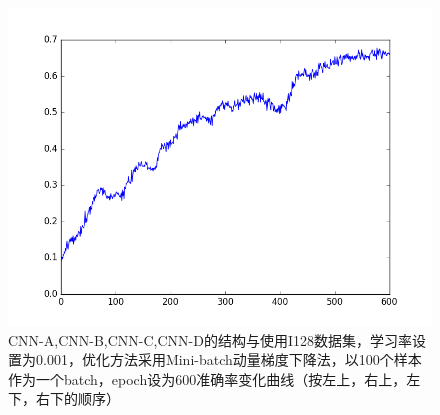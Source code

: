 \begin{figure}[htb]
\includegraphics[scale=0.35]{../figures/Log/VGGNet_new6/VGGNet_new6_acc.png} 
\caption{CNN-A,CNN-B,CNN-C,CNN-D的结构与使用I128数据集，学习率设置为0.001，优化方法采用Mini-batch动量梯度下降法，以100个样本作为一个batch，epoch设为600准确率变化曲线（按左上，右上，左下，右下的顺序）}
\label{fig:cnn8}
\end{figure}





